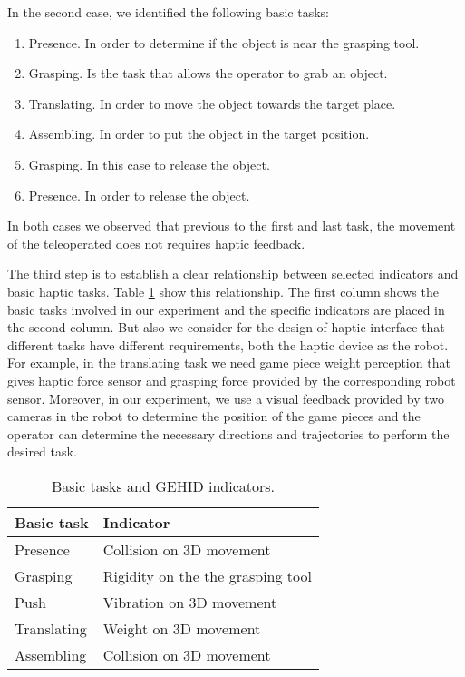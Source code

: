 \documentclass[journal,twoside]{JoPhA}
\begin{document}
In the second case, we identified the following basic tasks:
\begin{enumerate}
\item Presence. In order to determine if the object is near the grasping tool.
\item Grasping. Is the task that allows the operator to grab an object.
\item Translating. In order to move the object towards the target place.
\item Assembling. In order to put the object in the target position.
\item Grasping. In this case to release the object.
\item Presence. In order to release the object.
\end{enumerate}

In both cases we observed that previous to the first and last task, the movement of the teleoperated does not requires haptic feedback.

The third step is to establish a clear relationship between selected indicators and basic haptic tasks. Table \ref{tabla_1} show this relationship. The first column shows the basic tasks involved in our  experiment and the specific indicators are placed in the second column. But also we consider for the design of haptic interface that different tasks have different requirements, both the haptic device as the robot. For example, in the translating task we need game piece weight perception that gives haptic force sensor and grasping force provided by the corresponding robot sensor. Moreover, in our experiment, we use a visual feedback provided by two cameras in the robot to determine the position of the game pieces and the operator can determine the necessary directions and trajectories to perform the desired task. 

\begin{table}[h]
\centering
\caption{\label{tabla_1}Basic tasks and GEHID indicators.}
\begin{tabular}{ll}
\hline 
\textbf{\footnotesize{}Basic task} & \textbf{\footnotesize{}Indicator}\tabularnewline
\hline 
{\footnotesize{}Presence} & {\footnotesize{}Collision on 3D movement}\tabularnewline
{\footnotesize{}Grasping} & {\footnotesize{}Rigidity on the the grasping tool}\tabularnewline
{\footnotesize{}Push} & {\footnotesize{}Vibration on 3D movement}\tabularnewline
{\footnotesize{}Translating} & {\footnotesize{}Weight on 3D movement}\tabularnewline
{\footnotesize{}Assembling} & {\footnotesize{}Collision on 3D movement}\tabularnewline
\hline 
\end{tabular}

\end{table}
\end{document}

